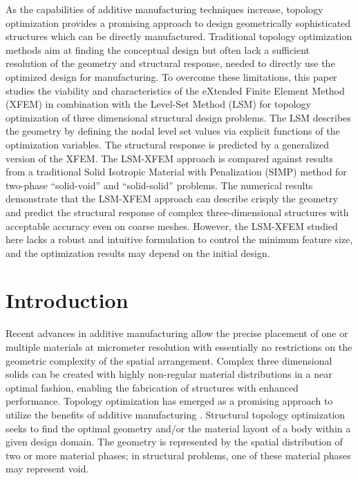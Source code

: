 

As the capabilities of additive manufacturing techniques increase, topology optimization provides a promising approach to design geometrically sophisticated structures which can be directly manufactured. Traditional topology optimization methods aim at finding the conceptual design but often lack a sufficient resolution of the geometry and structural response, needed to directly use the optimized design for manufacturing. To overcome these limitations, this paper studies the viability and characteristics of the eXtended Finite Element Method (XFEM) in combination with the Level-Set Method (LSM) for topology optimization of three dimensional structural design problems. The LSM describes the geometry by defining the nodal level set values via explicit functions of the optimization variables. The structural response is predicted by a generalized version of the XFEM. The LSM-XFEM approach is compared against results from a traditional Solid Isotropic Material with Penalization (SIMP) method for two-phase ``solid-void'' and ``solid-solid'' problems. The numerical results demonstrate that the LSM-XFEM approach can describe crisply the geometry and predict the structural response of complex three-dimensional structures with acceptable accuracy even on coarse meshes. However, the LSM-XFEM studied here lacks a robust and intuitive formulation to control the minimum feature size, and the optimization results may depend on the initial design.

% 


\section{Introduction}
\label{sec:intro}

Recent advances in additive manufacturing allow the precise placement of one or multiple materials at micrometer resolution with essentially no restrictions on the geometric complexity of the spatial arrangement. Complex three dimensional solids can be created with highly non-regular material distributions in a near optimal fashion, enabling the fabrication of structures with enhanced performance. Topology optimization has emerged as a promising approach to utilize the benefits of additive manufacturing \citep{NP:12,MGW+:13}. Structural topology optimization seeks to find the optimal geometry and/or the material layout of a body within a given design domain. The geometry is represented by the spatial distribution of two or more material phases; in structural problems, one of these material phases may represent void.

